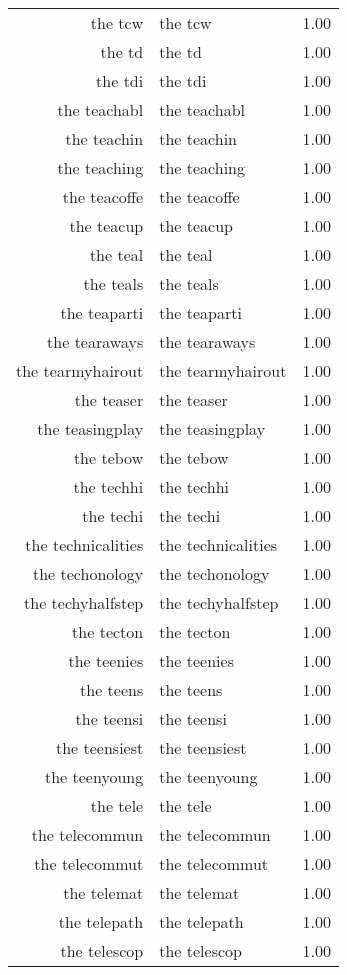 \begin{table}[ht]
\begin{tabular}{rlr}
  the tcw & the tcw & 1.00 \\ 
  the td & the td & 1.00 \\ 
  the tdi & the tdi & 1.00 \\ 
  the teachabl & the teachabl & 1.00 \\ 
  the teachin & the teachin & 1.00 \\ 
  the teaching & the teaching & 1.00 \\ 
  the teacoffe & the teacoffe & 1.00 \\ 
  the teacup & the teacup & 1.00 \\ 
  the teal & the teal & 1.00 \\ 
  the teals & the teals & 1.00 \\ 
  the teaparti & the teaparti & 1.00 \\ 
  the tearaways & the tearaways & 1.00 \\ 
  the tearmyhairout & the tearmyhairout & 1.00 \\ 
  the teaser & the teaser & 1.00 \\ 
  the teasingplay & the teasingplay & 1.00 \\ 
  the tebow & the tebow & 1.00 \\ 
  the techhi & the techhi & 1.00 \\ 
  the techi & the techi & 1.00 \\ 
  the technicalities & the technicalities & 1.00 \\ 
  the techonology & the techonology & 1.00 \\ 
  the techyhalfstep & the techyhalfstep & 1.00 \\ 
  the tecton & the tecton & 1.00 \\ 
  the teenies & the teenies & 1.00 \\ 
  the teens & the teens & 1.00 \\ 
  the teensi & the teensi & 1.00 \\ 
  the teensiest & the teensiest & 1.00 \\ 
  the teenyoung & the teenyoung & 1.00 \\ 
  the tele & the tele & 1.00 \\ 
  the telecommun & the telecommun & 1.00 \\ 
  the telecommut & the telecommut & 1.00 \\ 
  the telemat & the telemat & 1.00 \\ 
  the telepath & the telepath & 1.00 \\ 
  the telescop & the telescop & 1.00 \\ 

\end{tabular}
\end{table}
